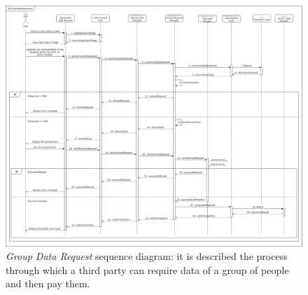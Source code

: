 \begin{figure}[H]
  \begin{center}
  	\includegraphics[width=\textwidth]{./img/sequence/groupDataRequest.png}
    \hspace{0.05\linewidth}
    \centering
    \caption{\textit{Group Data Request} sequence diagram: it is described the process through which a third party can require data of a group of people and then pay them.}
		\label{img:groupDataRequest}
    \end{center}
\end{figure}

